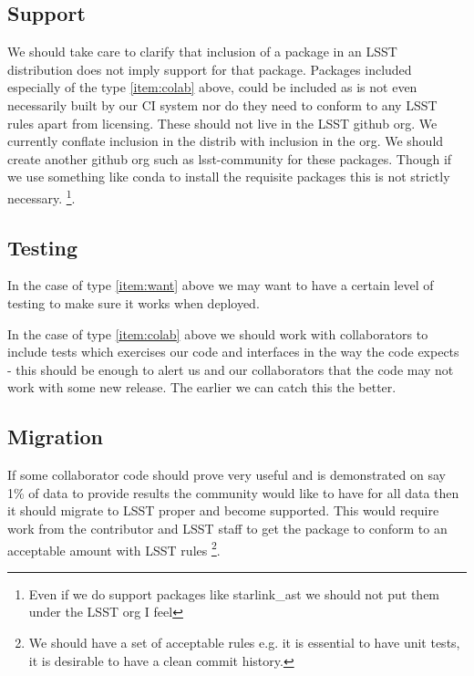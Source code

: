 \subsection{Support}\label{sec:support}
We should take care to clarify that inclusion of a package in an LSST distribution does not imply support for that package.
Packages included especially of the type \ref{item:colab} above, could be included as is not even necessarily built by our CI system nor do they need to conform to any LSST rules apart from licensing.
These should not live in the LSST github org. We currently conflate inclusion in the distrib with inclusion in the org.
We should create another github org such as lsst-community for these packages. Though if we use something like conda to install the requisite packages this is not strictly necessary.
\footnote{Even if we do support packages like starlink\_ast we should not put them under the LSST org I feel}.

\subsection{Testing} \label{sec:p3test}
In the case of type \ref{item:want} above we may want to have a certain level of testing to make sure it works when deployed.

In the case of type \ref{item:colab} above we should work with collaborators to include tests which exercises our code and interfaces in the way the code expects - this should be enough to alert us and our collaborators that the code may not work with some new release. The earlier we can catch this the better.
\subsection{Migration}\label{sec:migration}
If some collaborator code should prove very useful and is demonstrated  on say 1\% of data to provide results the community would like to have for all data then it should migrate to LSST proper and become supported. This would require work from the contributor and LSST staff to get the package to conform to an acceptable amount with LSST rules \footnote{We should have a set of acceptable rules e.g. it is essential to have unit tests, it is desirable to have a clean commit history.}.
